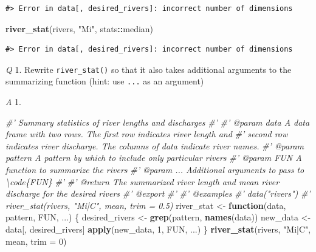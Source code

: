 \documentclass[
]{book}
\newenvironment{Shaded}{\begin{snugshade}}{\end{snugshade}}
\newcommand{\CommentTok}[1]{\textcolor[rgb]{0.56,0.35,0.01}{\textit{#1}}}
\newcommand{\ControlFlowTok}[1]{\textcolor[rgb]{0.13,0.29,0.53}{\textbf{#1}}}
\newcommand{\DataTypeTok}[1]{\textcolor[rgb]{0.13,0.29,0.53}{#1}}
\newcommand{\DecValTok}[1]{\textcolor[rgb]{0.00,0.00,0.81}{#1}}
\newcommand{\KeywordTok}[1]{\textcolor[rgb]{0.13,0.29,0.53}{\textbf{#1}}}
\newcommand{\NormalTok}[1]{#1}
\newcommand{\OperatorTok}[1]{\textcolor[rgb]{0.81,0.36,0.00}{\textbf{#1}}}
\newcommand{\StringTok}[1]{\textcolor[rgb]{0.31,0.60,0.02}{#1}}
\begin{document}
\begin{verbatim}
#> Error in data[, desired_rivers]: incorrect number of dimensions
\end{verbatim}

\begin{Shaded}
\begin{Highlighting}[]
\KeywordTok{river_stat}\NormalTok{(rivers, }\StringTok{"Mi"}\NormalTok{, stats}\OperatorTok{::}\NormalTok{median)}
\end{Highlighting}
\end{Shaded}

\begin{verbatim}
#> Error in data[, desired_rivers]: incorrect number of dimensions
\end{verbatim}

\emph{Q} 1. Rewrite \texttt{river\_stat()} so that it also takes additional arguments to the summarizing function (hint: use \texttt{...} as an argument)

\emph{A} 1.

\begin{Shaded}
\begin{Highlighting}[]
\CommentTok{#' Summary statistics of river lengths and discharges}
\CommentTok{#'}
\CommentTok{#' @param data A data frame with two rows. The first row indicates river length and}
\CommentTok{#'   second row indicates river discharge. The columns of data indicate river names.}
\CommentTok{#' @param pattern A pattern by which to include only particular rivers}
\CommentTok{#' @param FUN A function to summarize the rivers}
\CommentTok{#' @param ... Additional arguments to pass to \textbackslash{}code\{FUN\}}
\CommentTok{#'}
\CommentTok{#' @return The summarized river length and mean river discharge for the desired rivers}
\CommentTok{#' @export}
\CommentTok{#'}
\CommentTok{#' @examples}
\CommentTok{#' data("rivers")}
\CommentTok{#' river_stat(rivers, "Mi|C", mean, trim = 0.5)}
\NormalTok{river_stat <-}\StringTok{ }\ControlFlowTok{function}\NormalTok{(data, pattern, FUN, ...) \{}
\NormalTok{  desired_rivers <-}\StringTok{ }\KeywordTok{grep}\NormalTok{(pattern, }\KeywordTok{names}\NormalTok{(data))}
\NormalTok{  new_data <-}\StringTok{ }\NormalTok{data[, desired_rivers]}
  \KeywordTok{apply}\NormalTok{(new_data, }\DecValTok{1}\NormalTok{, FUN, ...)}
\NormalTok{\}}
\KeywordTok{river_stat}\NormalTok{(rivers, }\StringTok{"Mi|C"}\NormalTok{, mean, }\DataTypeTok{trim =} \DecValTok{0}\NormalTok{)}
\end{Highlighting}
\end{Shaded}
\end{document}
